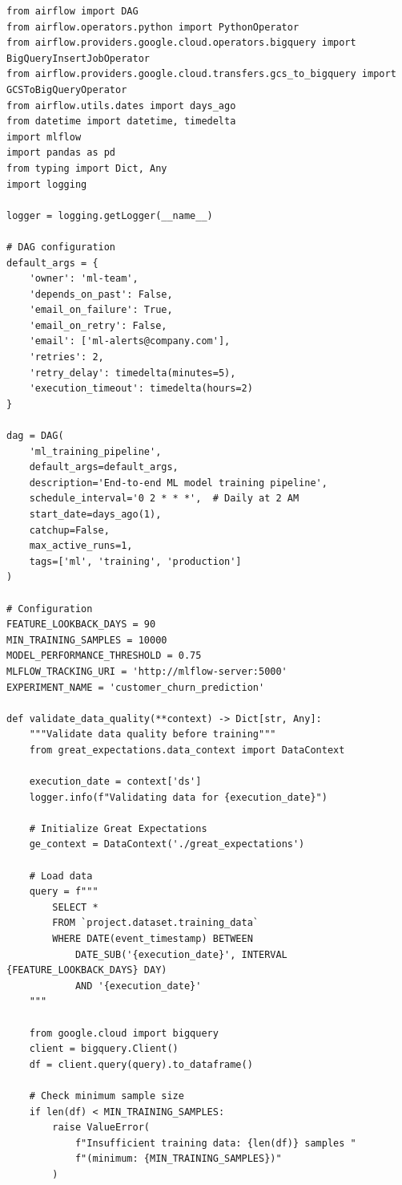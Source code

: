 \begin{lstlisting}[style=python, caption=Production ML Training Pipeline with Airflow]
from airflow import DAG
from airflow.operators.python import PythonOperator
from airflow.providers.google.cloud.operators.bigquery import BigQueryInsertJobOperator
from airflow.providers.google.cloud.transfers.gcs_to_bigquery import GCSToBigQueryOperator
from airflow.utils.dates import days_ago
from datetime import datetime, timedelta
import mlflow
import pandas as pd
from typing import Dict, Any
import logging

logger = logging.getLogger(__name__)

# DAG configuration
default_args = {
    'owner': 'ml-team',
    'depends_on_past': False,
    'email_on_failure': True,
    'email_on_retry': False,
    'email': ['ml-alerts@company.com'],
    'retries': 2,
    'retry_delay': timedelta(minutes=5),
    'execution_timeout': timedelta(hours=2)
}

dag = DAG(
    'ml_training_pipeline',
    default_args=default_args,
    description='End-to-end ML model training pipeline',
    schedule_interval='0 2 * * *',  # Daily at 2 AM
    start_date=days_ago(1),
    catchup=False,
    max_active_runs=1,
    tags=['ml', 'training', 'production']
)

# Configuration
FEATURE_LOOKBACK_DAYS = 90
MIN_TRAINING_SAMPLES = 10000
MODEL_PERFORMANCE_THRESHOLD = 0.75
MLFLOW_TRACKING_URI = 'http://mlflow-server:5000'
EXPERIMENT_NAME = 'customer_churn_prediction'

def validate_data_quality(**context) -> Dict[str, Any]:
    """Validate data quality before training"""
    from great_expectations.data_context import DataContext

    execution_date = context['ds']
    logger.info(f"Validating data for {execution_date}")

    # Initialize Great Expectations
    ge_context = DataContext('./great_expectations')

    # Load data
    query = f"""
        SELECT *
        FROM `project.dataset.training_data`
        WHERE DATE(event_timestamp) BETWEEN
            DATE_SUB('{execution_date}', INTERVAL {FEATURE_LOOKBACK_DAYS} DAY)
            AND '{execution_date}'
    """

    from google.cloud import bigquery
    client = bigquery.Client()
    df = client.query(query).to_dataframe()

    # Check minimum sample size
    if len(df) < MIN_TRAINING_SAMPLES:
        raise ValueError(
            f"Insufficient training data: {len(df)} samples "
            f"(minimum: {MIN_TRAINING_SAMPLES})"
        )


\end{lstlisting}
